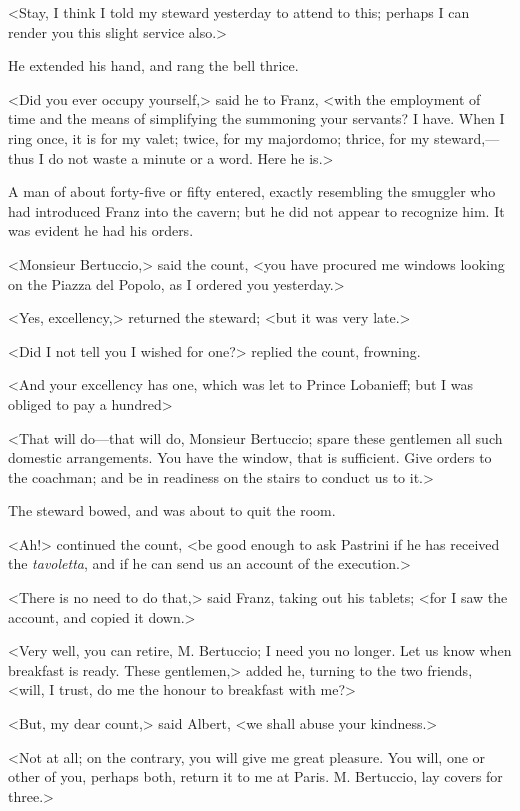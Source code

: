  <Stay, I think I told my steward yesterday to attend to this; perhaps I can render you this slight service also.> 

 He extended his hand, and rang the bell thrice. 

 <Did you ever occupy yourself,> said he to Franz, <with the employment of time and the means of simplifying the summoning your servants? I have. When I ring once, it is for my valet; twice, for my majordomo; thrice, for my steward,—thus I do not waste a minute or a word. Here he is.> 

 A man of about forty-five or fifty entered, exactly resembling the smuggler who had introduced Franz into the cavern; but he did not appear to recognize him. It was evident he had his orders. 

 <Monsieur Bertuccio,> said the count, <you have procured me windows looking on the Piazza del Popolo, as I ordered you yesterday.> 

 <Yes, excellency,> returned the steward; <but it was very late.> 

 <Did I not tell you I wished for one?> replied the count, frowning. 

 <And your excellency has one, which was let to Prince Lobanieff; but I was obliged to pay a hundred\longdash> 

 <That will do—that will do, Monsieur Bertuccio; spare these gentlemen all such domestic arrangements. You have the window, that is sufficient. Give orders to the coachman; and be in readiness on the stairs to conduct us to it.> 

 The steward bowed, and was about to quit the room. 

 <Ah!> continued the count, <be good enough to ask Pastrini if he has received the \textit{tavoletta}, and if he can send us an account of the execution.> 

 <There is no need to do that,> said Franz, taking out his tablets; <for I saw the account, and copied it down.> 

 <Very well, you can retire, M. Bertuccio; I need you no longer. Let us know when breakfast is ready. These gentlemen,> added he, turning to the two friends, <will, I trust, do me the honour to breakfast with me?> 

 <But, my dear count,> said Albert, <we shall abuse your kindness.> 

 <Not at all; on the contrary, you will give me great pleasure. You will, one or other of you, perhaps both, return it to me at Paris. M. Bertuccio, lay covers for three.> 

